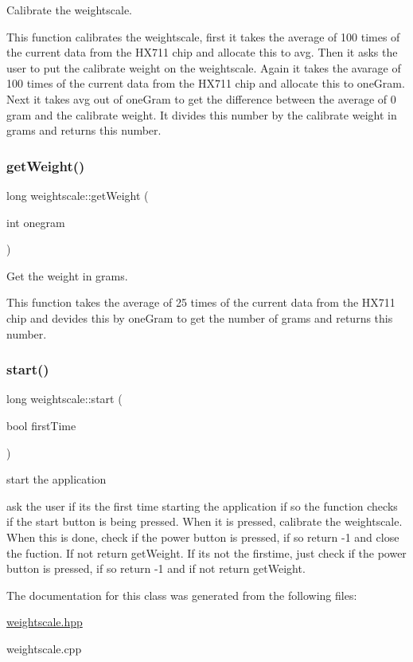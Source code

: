 Calibrate the weightscale. 

This function calibrates the weightscale, first it takes the average of 100 times of the current data from the H\+X711 chip and allocate this to avg. Then it asks the user to put the calibrate weight on the weightscale. Again it takes the avarage of 100 times of the current data from the H\+X711 chip and allocate this to one\+Gram. Next it takes avg out of one\+Gram to get the difference between the average of \textquotesingle{}0\textquotesingle{} gram and the calibrate weight. It divides this number by the calibrate weight in grams and returns this number. \mbox{\label{classweightscale_a8ade4a94ff398976d4378d47bfa5a378}} 
\subsubsection{\texorpdfstring{get\+Weight()}{getWeight()}}
{\footnotesize\ttfamily long weightscale\+::get\+Weight (\begin{DoxyParamCaption}\item[{int}]{onegram }\end{DoxyParamCaption})}



Get the weight in grams. 

This function takes the average of 25 times of the current data from the H\+X711 chip and devides this by one\+Gram to get the number of grams and returns this number. \mbox{\label{classweightscale_acc00962ffad1671326cf059bdbb3f684}} 
\subsubsection{\texorpdfstring{start()}{start()}}
{\footnotesize\ttfamily long weightscale\+::start (\begin{DoxyParamCaption}\item[{bool}]{first\+Time }\end{DoxyParamCaption})}



start the application 

ask the user if its the first time starting the application if so the function checks if the start button is being pressed. When it is pressed, calibrate the weightscale. When this is done, check if the power button is pressed, if so return -\/1 and close the fuction. If not return get\+Weight. If it\textquotesingle{}s not the firstime, just check if the power button is pressed, if so return -\/1 and if not return get\+Weight. 

The documentation for this class was generated from the following files\+:\begin{DoxyCompactItemize}
\item 
\hyperlink{weightscale_8hpp}{weightscale.\+hpp}\item 
weightscale.\+cpp\end{DoxyCompactItemize}

